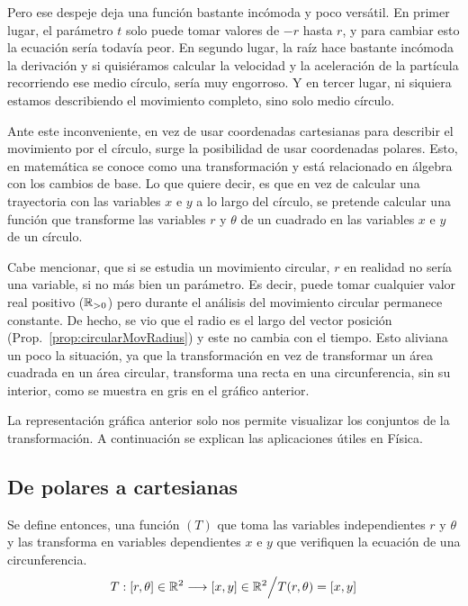 \documentclass[a5paper,12pt,twoside]{book}
\begin{document}
Pero ese despeje deja una función bastante incómoda y poco versátil. En primer lugar, el parámetro $t$ solo puede tomar valores de $-r$ hasta $r$, y para cambiar esto la ecuación sería todavía peor. En segundo lugar, la raíz hace bastante incómoda la derivación y si quisiéramos calcular la velocidad y la aceleración de la partícula recorriendo ese medio círculo, sería muy engorroso. Y en tercer lugar, ni siquiera estamos describiendo el movimiento completo, sino solo medio círculo.

Ante este inconveniente, en vez de usar coordenadas cartesianas para describir el movimiento por el círculo, surge la posibilidad de usar coordenadas polares. Esto, en matemática se conoce como una transformación y está relacionado en álgebra con los cambios de base. Lo que quiere decir, es que en vez de calcular una trayectoria con las variables $x$ e $y$ a lo largo del círculo, se pretende calcular una función que transforme las variables $r$ y $\theta$ de un cuadrado en las variables $x$ e $y$ de un círculo.

\begin{center}
    \def\svgwidth{\linewidth}
    
\end{center}

Cabe mencionar, que si se estudia un movimiento circular, $r$ en realidad no sería una variable, si no más bien un parámetro. Es decir, puede tomar cualquier valor real positivo ($\mathbb{R}_{> 0}$) pero durante el análisis del movimiento circular permanece constante. De hecho, se vio que el radio es el largo del vector posición (Prop.\ \ref{prop:circularMovRadius}) y este no cambia con el tiempo. Esto aliviana un poco la situación, ya que la transformación en vez de transformar un área cuadrada en un área circular, transforma una recta en una circunferencia, sin su interior, como se muestra en gris en el gráfico anterior.

La representación gráfica anterior solo nos permite visualizar los conjuntos de la transformación. A continuación se explican las aplicaciones útiles en Física.

\subsection{De polares a cartesianas}

Se define entonces, una función $(T)$ que toma las variables independientes $r$ y $\theta$ y las transforma en variables dependientes $x$ e $y$ que verifiquen la ecuación de una circunferencia.
\[
    T:[r,\theta] \in \mathbb{R}^2 \longrightarrow [x,y] \in \mathbb{R}^2 \Big/
    T(r,\theta) = [x,y]
\]
\end{document}
